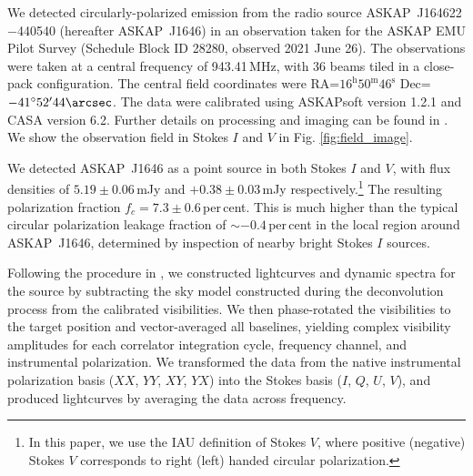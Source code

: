 \documentclass[fleqn,usenatbib]{mnras}
\newcommand{\todo}[1]{\textcolor{red}{TODO: #1}\PackageWarning{TODO:}{#1!}}
\newcommand{\blinkyaskap}{{ASKAP}~J1646}
\begin{document}
We detected circularly-polarized emission from the radio source ASKAP~J164622$-$440540 (hereafter \blinkyaskap{}) in an observation taken for the ASKAP EMU Pilot Survey \citep{2021PASA...38...46N} (Schedule Block ID 28280, observed 2021 June 26). The observations were taken at a central frequency of 943.41\,MHz, with 36 beams tiled in a close-pack configuration. The central field coordinates were RA=$16^{\text{h}}50^{\text{m}}46^{\text{s}}$ Dec=$-41^{\circ}52^{\prime}44\arcsec$. The data were calibrated using ASKAPsoft version 1.2.1 and CASA version 6.2. Further details on processing and imaging can be found in \citet{2021PASA...38...46N}. We show the observation field in Stokes $I$ and $V$ in Fig. \ref{fig:field_image}. %

We detected \blinkyaskap{} as a point source in both Stokes $I$ and $V$, with flux densities of $5.19\pm0.06$\,mJy and $+0.38\pm0.03$\,mJy respectively.\footnote{In this paper, we use the IAU definition of Stokes $V$, where positive (negative) Stokes $V$ corresponds to right (left) handed circular polarization.} The resulting polarization fraction $f_c=7.3\pm0.6$\,per\,cent. This is much higher than the typical circular polarization leakage fraction of $\sim -0.4$\,per\,cent in the local region around \blinkyaskap{}, determined by inspection of nearby bright Stokes $I$ sources.

Following the procedure in \citet{2019MNRAS.488..559Z}, we constructed lightcurves and dynamic spectra for the source by subtracting the sky model constructed during the deconvolution process from the calibrated visibilities. We then phase-rotated the visibilities to the target position and vector-averaged all baselines, yielding complex visibility amplitudes for each correlator integration cycle, frequency channel, and instrumental polarization. We transformed the data from the native instrumental polarization basis ($XX$, $YY$, $XY$, $YX$) into the Stokes basis ($I$, $Q$, $U$, $V$), and produced lightcurves by averaging the data across frequency.
\end{document}
